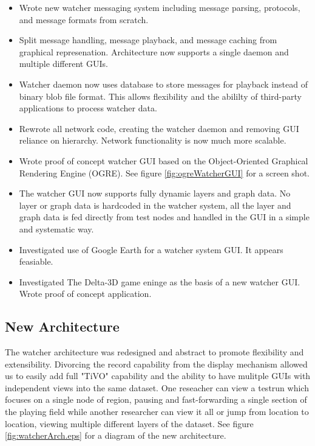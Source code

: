 \documentclass{report}
\begin{document}
\begin{itemize}
\item Wrote new watcher messaging system including message parsing, protocols, and message formats from scratch. 
\item Split message handling, message playback, and message caching from graphical represenation. Architecture now
supports a single daemon and multiple different GUIs. 
\item Watcher daemon now uses database to store messages for playback instead of binary blob file format. This allows
flexibility and the abililty of third-party applications to process watcher data. 
\item Rewrote all network code, creating the watcher daemon and removing GUI reliance on hierarchy. Network functionality is now
much more scalable. 
\item Wrote proof of concept watcher GUI based on the Object-Oriented Graphical Rendering Engine (OGRE). See figure \ref{fig:ogreWatcherGUI} for a 
screen shot. 
\item The watcher GUI now supports fully dynamic layers and graph data. No layer or graph data is hardcoded in the watcher system, all 
the layer and graph data is fed directly from test nodes and handled in the GUI in a simple and systematic way.
\item Investigated use of Google Earth for a watcher system GUI. It appears feasiable. 
\item Investigated The Delta-3D game eninge as the basis of a new watcher GUI. Wrote proof of concept application. 
\end{itemize}


\subsection{New Architecture}

The watcher architecture was redesigned and abstract to promote flexibility and extensibility. Divorcing the record 
capability from the display mechanism allowed us to easily add full "TiVO" capability and the ability to have mulitple 
GUIs with independent views into the same dataset. One reseacher can view a testrun which focuses on a single node of region, 
pausing and fast-forwarding a single section of the playing field while another researcher can view it all or jump from 
location to location, viewing multiple different layers of the dataset. See figure \ref{fig:watcherArch.eps} for a diagram 
of the new architecture.
\end{document}
